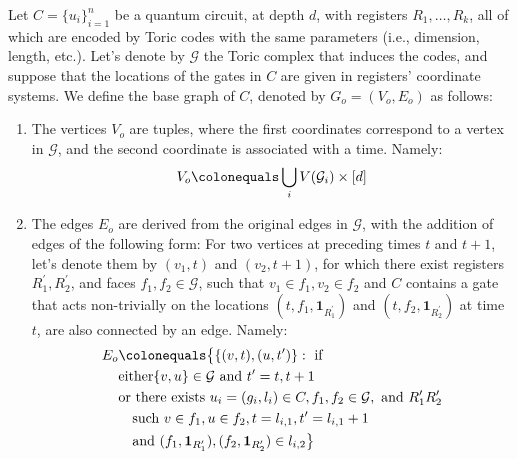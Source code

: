   \begin{definition}
Let $C = \{u_{i}\}_{i=1}^{n}$ be a quantum circuit, at depth $d$, with registers $R_{1}, \ldots, R_{k}$, all of which are encoded by Toric codes with the same parameters (i.e., dimension, length, etc.). Let's denote by $\mathcal{G}$ the Toric complex that induces the codes, and suppose that the locations of the gates in $C$ are given in registers' coordinate systems. We define the base graph of $C$, denoted by $G_{o} = (V_{o},E_{o})$ as follows: 
    \begin{enumerate}
      \item The vertices $V_{o}$ are tuples, where the first coordinates correspond to a vertex in $\mathcal{G}$, and the second coordinate is associated with a time. Namely:
        \begin{equation*}
          \begin{split}
            V_{o} \colonequals \bigcup_{i}V(\mathcal{G}_{i}) \times [d] %
          \end{split}
        \end{equation*}
      \item The edges $E_{o}$ are derived from the original edges in $\mathcal{G}$, with the addition of edges of the following form: For two vertices at preceding times $t$ and $t+1$, let's denote them by $(v_{1},t)$ and $(v_{2},t+1)$, for which there exist registers $R^{\prime}_{1}, R^{\prime}_{2}$, and faces $f_{1}, f_{2} \in \mathcal{G}$, such that $v_{1} \in f_{1}, v_{2} \in f_{2}$ and $C$ contains a gate that acts non-trivially on the locations $(t,f_{1},\mathbf{1}_{R^{\prime}_{1}})$ and $(t,f_{2},\mathbf{1}_{R^{\prime}_{2}})$ at time $t$, are also connected by an edge. Namely:
        \begin{equation*}
          \begin{split}
            E_{o} & \colonequals \big\{ \{(v,t), (u,t^{\prime}) \} :  \text{ if }     \\ 
              & \text{either}  \{v,u\} \in \mathcal{G} \text{ and } t^{\prime} = t,t+1 \\
              & \text{or there exists } u_i = (g_{i},l_{i}) \in C, f_{1},f_{2} \in \mathcal{G}, \text{ and }  R^{\prime}_{1} R^{\prime}_{2} \\
          & \ \ \text{ such }  v\in f_{1} ,u\in f_{2}, t = l_{i,1}, t^{\prime} = l_{i,1}+1 \\ 
        & \ \ \text{ and } (f_{1},\mathbf{1}_{R^{\prime}_{1}}), (f_{2},\mathbf{1}_{R^{\prime}_{2}}) \in l_{i,2} \big\} 
          \end{split}
        \end{equation*}
    \end{enumerate} 
  \end{definition}

